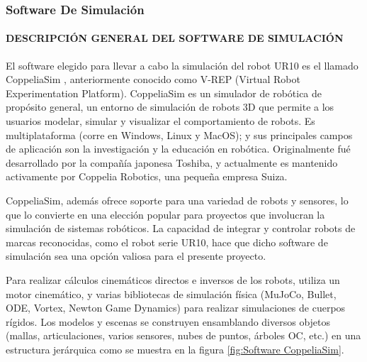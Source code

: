 \documentclass{article}
\begin{document}
\begin{sloppypar}
\subsubsection{Software De Simulación}
\label{sec:Software De Simulación}

\paragraph{DESCRIPCIÓN GENERAL DEL SOFTWARE DE SIMULACIÓN}
\label{sec:DESCRIPCIÓN GENERAL DEL SOFTWARE DE SIMULACIÓN}
\hfill

El software elegido para llevar a cabo la simulación del robot UR10 es el llamado CoppeliaSim \cite{CoppeliaSim}, anteriormente conocido como V-REP (Virtual Robot Experimentation Platform). CoppeliaSim es un simulador de robótica de propósito general, un entorno de simulación de robots 3D que permite a los usuarios modelar, simular y visualizar el comportamiento de robots. Es multiplataforma (corre en Windows, Linux y MacOS); y sus principales campos de aplicación son la investigación y la educación en robótica. Originalmente fué desarrollado por la compañía japonesa Toshiba, y actualmente es mantenido activamente por Coppelia Robotics, una pequeña empresa Suiza.

CoppeliaSim, además ofrece soporte para una variedad de robots y sensores, lo que lo convierte en una elección popular para proyectos que involucran la simulación de sistemas robóticos. La capacidad de integrar y controlar robots de marcas reconocidas, como el robot serie UR10, hace que dicho software de simulación sea una opción valiosa para el presente proyecto.

Para realizar cálculos cinemáticos directos e inversos de los robots, utiliza un motor cinemático, y varias bibliotecas de simulación física (MuJoCo, Bullet, ODE, Vortex, Newton Game Dynamics) para realizar simulaciones de cuerpos rígidos. Los modelos y escenas se construyen ensamblando diversos objetos (mallas, articulaciones, varios sensores, nubes de puntos, árboles OC, etc.) en una estructura jerárquica como se muestra en la figura \ref{fig:Software CoppeliaSim}.


\end{sloppypar}
\end{document}
